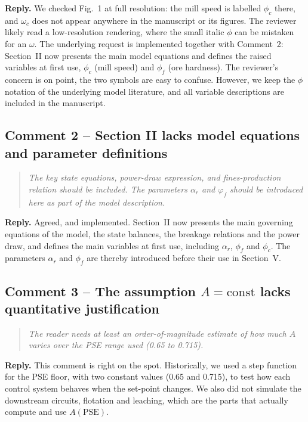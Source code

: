 \documentclass[11pt]{article}
\newenvironment{reviewquote}%
  {\begin{quote}\itshape}%
  {\end{quote}}
\begin{document}
\textbf{Reply.} We checked Fig.~1 at full resolution: the mill speed is
labelled $\phi_c$ there, and $\omega_c$ does not appear anywhere in the
manuscript or its figures. The reviewer likely read a low-resolution
rendering, where the small italic $\phi$ can be mistaken for an
$\omega$. The underlying request is implemented together with
Comment~2: Section~II now presents the main model equations and defines
the raised variables at first use, $\phi_c$ (mill speed) and $\phi_f$
(ore hardness). The reviewer's concern is on point, the two symbols are
easy to confuse. However, we keep the $\phi$ notation of the underlying
model literature, and all variable descriptions are included in the
manuscript.

\subsection*{Comment 2 -- Section II lacks model equations and parameter definitions}

\begin{reviewquote}
The key state equations, power-draw expression, and fines-production
relation should be included. The parameters $\alpha_r$ and $\varphi_f$
should be introduced here as part of the model description.
\end{reviewquote}

\textbf{Reply.} Agreed, and implemented. Section~II now presents the
main governing equations of the model, the state balances, the breakage
relations and the power draw, and defines the main variables at first
use, including $\alpha_r$, $\phi_f$ and $\phi_c$. The parameters
$\alpha_r$ and $\phi_f$ are thereby introduced before their use in
Section~V.

\subsection*{Comment 3 -- The assumption $A=\mathrm{const}$ lacks quantitative justification}

\begin{reviewquote}
The reader needs at least an order-of-magnitude estimate of how much
$A$ varies over the PSE range used (0.65 to 0.715).
\end{reviewquote}

\textbf{Reply.} This comment is right on the spot. Historically, we
used a step function for the PSE floor, with two constant values (0.65
and 0.715), to test how each control system behaves when the set-point
changes. We also did not simulate the downstream circuits, flotation
and leaching, which are the parts that actually compute and use
$A(\mathrm{PSE})$.
\end{document}
